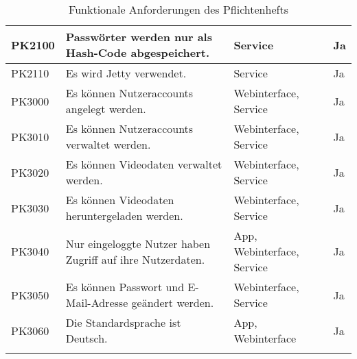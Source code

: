 \begin{longtable}{p{} | p{} | p{} | p{}}
   \\
  \hline 
  PK2100 & Passwörter werden nur als Hash-Code abgespeichert. & Service & Ja
   \\
  \hline 
  PK2110 & Es wird Jetty verwendet. & Service & Ja
   \\
  \hline 
  PK3000 & Es können Nutzeraccounts angelegt werden. & Webinterface, Service & Ja
   \\
  \hline 
  PK3010 & Es können Nutzeraccounts verwaltet werden. & Webinterface, Service & Ja
   \\
  \hline 
  PK3020 & Es können Videodaten verwaltet werden. & Webinterface, Service & Ja
   \\
  \hline 
  PK3030 & Es können Videodaten heruntergeladen werden. & Webinterface, Service & Ja
   \\
  \hline 
  PK3040 & Nur eingeloggte Nutzer haben Zugriff auf ihre Nutzerdaten. & App, Webinterface, Service & Ja
   \\
  \hline 
  PK3050 & Es können Passwort und E-Mail-Adresse geändert werden. & Webinterface, Service & Ja
   \\
  \hline 
  PK3060 & Die Standardsprache ist Deutsch. & App, Webinterface & Ja
  \\
  \hline
  \caption{Funktionale Anforderungen des Pflichtenhefts}
 \end{longtable}